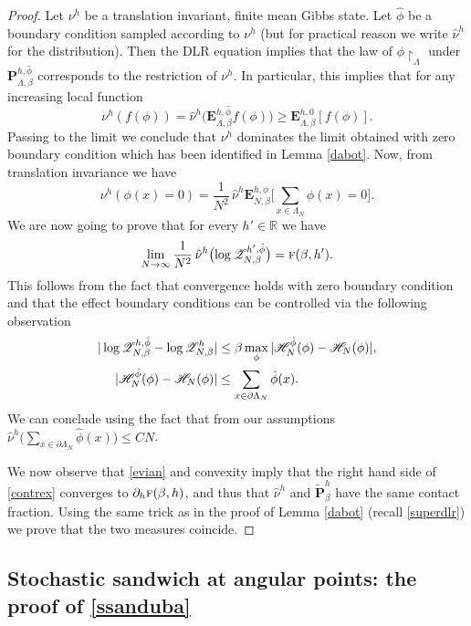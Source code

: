 \documentclass[10pt]{amsart}
\let\mathcal\mathscr
\numberwithin{equation}{section}
\theoremstyle{plain}
\theoremstyle{definition}
\newcommand{\restrict}{\!\!\upharpoonright}
\newcommand{\cH}{{\ensuremath{\mathcal H}} }
\newcommand{\cZ}{{\ensuremath{\mathcal Z}} }
\newcommand{\bP}{{\ensuremath{\mathbf P}} }
\newcommand{\bE}{{\ensuremath{\mathbf E}} }
\newcommand{\bbR}{{\ensuremath{\mathbb R}} }
\newcommand{\gb}{\beta}
\newcommand{\gL}{\Lambda}
\newcommand{\tf}{\textsc{f}}
\begin{document}
\begin{proof}
Let $\nu^h$ be a translation invariant, finite mean Gibbs state.
Let $\hat \phi$ be a boundary condition sampled according to $\nu^h$ (but for practical reason we write $\hat \nu^h$ for the distribution).
Then the DLR equation implies that the law of $\phi\restrict_{\gL}$ under $\bP^{h,\hat \phi}_{\gL,\gb}$ corresponds to the restriction of $\nu^h$.
In particular, this implies that for any increasing local function
\begin{equation*}
\nu^h(f(\phi))=\hat \nu^h\bigl(\bE^{h,\hat \phi}_{\gL,\gb}f(\phi)\bigr)\ge \bE^{h,0}_{\gL,\gb}[f(\phi)].
\end{equation*}
Passing to the limit we conclude that $\nu^h$ dominates the limit obtained with zero boundary condition which has been identified in Lemma \ref{dabot}.
Now, from translation invariance we have
\begin{equation}\label{contrex}
\nu^h(\phi(x)=0)=\frac{1}{N^2}\,\hat \nu^{h}\bE^{h,\hat \phi}_{N,\gb}\biggl[\sum_{x\in \gL_N} \phi(x)=0\biggr].
\end{equation}
We are now going to prove that for every $h'\in \bbR$ we have
\begin{equation}\label{evian}
\lim_{N\to \infty}\frac{1}{N^2}\,\hat \nu^{h}\bigl(\log \cZ^{h',\hat \phi}_{N,\gb}\bigr)=\tf(\gb,h').
\end{equation}
This follows from the fact that convergence holds with zero boundary condition
and that the effect boundary conditions can be controlled via the following observation
\begin{align*}
|\log \cZ^{h,\hat \phi}_{N,\gb}-\log \cZ^{h}_{N,\gb}|&\le \gb\max_{\phi}|\cH^{\hat \phi}_{N}(\phi)- \cH_{N}(\phi)|,\notag
\\
|\cH^{\hat \phi}_{N}(\phi)- \cH_{N}(\phi)|&\le \sum_{x\in \partial \gL_N} \hat \phi(x).
\end{align*}
We can conclude using the fact that from our assumptions $\hat \nu^h\bigl(\sum_{x\in \partial \gL_N} \hat \phi(x)\bigr)\le CN$.

We now observe that \eqref{evian} and convexity imply that the right hand side of \eqref{contrex} converges to $\partial_h\tf(\gb,h)$,
and thus that $\hat \nu^h$ and $\tilde \bP^h_{\gb}$ have the same contact fraction.
Using the same trick as in the proof of Lemma \ref{dabot} (recall \eqref{superdlr}) we prove that the two measures coincide.
\end{proof}

\subsection{Stochastic sandwich at angular points: the proof of \eqref{ssanduba}}\label{sanduba}
\end{document}

